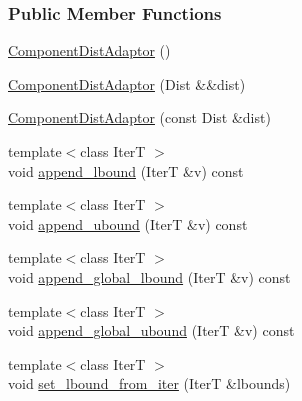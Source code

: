 \subsubsection*{Public Member Functions}
\begin{DoxyCompactItemize}
\item 
\hyperlink{classprior__hessian_1_1CompositeDist_1_1ComponentDistAdaptor_3_01Dist_00_01meta_1_1EnableIfSubclc6c9bd83bba546a81e521c87ad7ee6d3_a7a332528c289f8380d62fa35bafef494}{Component\+Dist\+Adaptor} ()
\item 
\hyperlink{classprior__hessian_1_1CompositeDist_1_1ComponentDistAdaptor_3_01Dist_00_01meta_1_1EnableIfSubclc6c9bd83bba546a81e521c87ad7ee6d3_ad0c6091eb8b8bd9e5896ef3b1f01e07c}{Component\+Dist\+Adaptor} (Dist \&\&dist)
\item 
\hyperlink{classprior__hessian_1_1CompositeDist_1_1ComponentDistAdaptor_3_01Dist_00_01meta_1_1EnableIfSubclc6c9bd83bba546a81e521c87ad7ee6d3_a6abccb6e0fb49d4f1b5ed5f242f4a09a}{Component\+Dist\+Adaptor} (const Dist \&dist)
\item 
{\footnotesize template$<$class IterT $>$ }\\void \hyperlink{classprior__hessian_1_1CompositeDist_1_1ComponentDistAdaptor_3_01Dist_00_01meta_1_1EnableIfSubclc6c9bd83bba546a81e521c87ad7ee6d3_aedfbb603408ea84a80ba7c21c8910e66}{append\+\_\+lbound} (IterT \&v) const 
\item 
{\footnotesize template$<$class IterT $>$ }\\void \hyperlink{classprior__hessian_1_1CompositeDist_1_1ComponentDistAdaptor_3_01Dist_00_01meta_1_1EnableIfSubclc6c9bd83bba546a81e521c87ad7ee6d3_af062076875843bcd913ff5f4b7b12699}{append\+\_\+ubound} (IterT \&v) const 
\item 
{\footnotesize template$<$class IterT $>$ }\\void \hyperlink{classprior__hessian_1_1CompositeDist_1_1ComponentDistAdaptor_3_01Dist_00_01meta_1_1EnableIfSubclc6c9bd83bba546a81e521c87ad7ee6d3_a1d66ce9255e672c44d926c8944ac30ce}{append\+\_\+global\+\_\+lbound} (IterT \&v) const 
\item 
{\footnotesize template$<$class IterT $>$ }\\void \hyperlink{classprior__hessian_1_1CompositeDist_1_1ComponentDistAdaptor_3_01Dist_00_01meta_1_1EnableIfSubclc6c9bd83bba546a81e521c87ad7ee6d3_a9b63fdd5b13a8dc9401f665a8da9b35c}{append\+\_\+global\+\_\+ubound} (IterT \&v) const 
\item 
{\footnotesize template$<$class IterT $>$ }\\void \hyperlink{classprior__hessian_1_1CompositeDist_1_1ComponentDistAdaptor_3_01Dist_00_01meta_1_1EnableIfSubclc6c9bd83bba546a81e521c87ad7ee6d3_a12e4ab22a6a61d9a9441a7e200e6beee}{set\+\_\+lbound\+\_\+from\+\_\+iter} (IterT \&lbounds)

\end{DoxyCompactItemize}
